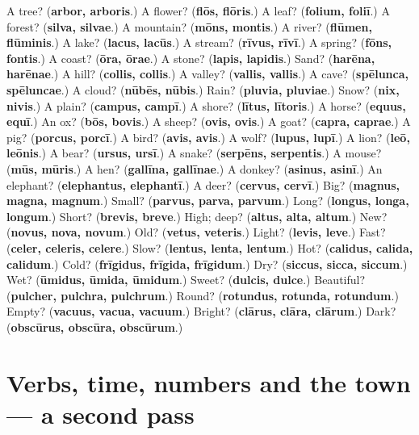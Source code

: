 \begin{tcolorbox}[breakable,colback=teal!4,colframe=teal!35!black,title={Before you move on}]
A tree? (\textbf{arbor, arboris}.) A flower? (\textbf{flōs, flōris}.) A leaf? (\textbf{folium, foliī}.) A forest? (\textbf{silva, silvae}.) A mountain? (\textbf{mōns, montis}.) A river? (\textbf{flūmen, flūminis}.) A lake? (\textbf{lacus, lacūs}.) A stream? (\textbf{rīvus, rīvī}.) A spring? (\textbf{fōns, fontis}.) A coast? (\textbf{ōra, ōrae}.) A stone? (\textbf{lapis, lapidis}.) Sand? (\textbf{harēna, harēnae}.) A hill? (\textbf{collis, collis}.) A valley? (\textbf{vallis, vallis}.) A cave? (\textbf{spēlunca, spēluncae}.) A cloud? (\textbf{nūbēs, nūbis}.) Rain? (\textbf{pluvia, pluviae}.) Snow? (\textbf{nix, nivis}.) A plain? (\textbf{campus, campī}.) A shore? (\textbf{lītus, lītoris}.) A horse? (\textbf{equus, equī}.) An ox? (\textbf{bōs, bovis}.) A sheep? (\textbf{ovis, ovis}.) A goat? (\textbf{capra, caprae}.) A pig? (\textbf{porcus, porcī}.) A bird? (\textbf{avis, avis}.) A wolf? (\textbf{lupus, lupī}.) A lion? (\textbf{leō, leōnis}.) A bear? (\textbf{ursus, ursī}.) A snake? (\textbf{serpēns, serpentis}.) A mouse? (\textbf{mūs, mūris}.) A hen? (\textbf{gallīna, gallīnae}.) A donkey? (\textbf{asinus, asinī}.) An elephant? (\textbf{elephantus, elephantī}.) A deer? (\textbf{cervus, cervī}.) Big? (\textbf{magnus, magna, magnum}.) Small? (\textbf{parvus, parva, parvum}.) Long? (\textbf{longus, longa, longum}.) Short? (\textbf{brevis, breve}.) High; deep? (\textbf{altus, alta, altum}.) New? (\textbf{novus, nova, novum}.) Old? (\textbf{vetus, veteris}.) Light? (\textbf{levis, leve}.) Fast? (\textbf{celer, celeris, celere}.) Slow? (\textbf{lentus, lenta, lentum}.) Hot? (\textbf{calidus, calida, calidum}.) Cold? (\textbf{frīgidus, frīgida, frīgidum}.) Dry? (\textbf{siccus, sicca, siccum}.) Wet? (\textbf{ūmidus, ūmida, ūmidum}.) Sweet? (\textbf{dulcis, dulce}.) Beautiful? (\textbf{pulcher, pulchra, pulchrum}.) Round? (\textbf{rotundus, rotunda, rotundum}.) Empty? (\textbf{vacuus, vacua, vacuum}.) Bright? (\textbf{clārus, clāra, clārum}.) Dark? (\textbf{obscūrus, obscūra, obscūrum}.)
\end{tcolorbox}
\section[(dialogue)]{Verbs, time, numbers and the town — a second pass}

\label{lesson:LA-R108-second-pass-verbs-time-numbers-and-the-town}



